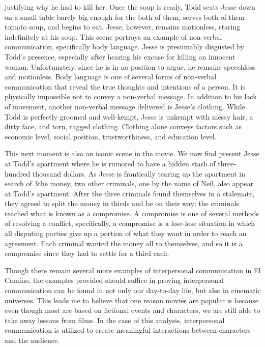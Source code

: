 \documentclass[12pt]{article}
\begin{document}
justifying why he had to kill her. Once the soup is ready, Todd seats Jesse down on
a small table barely big enough for the both of them, serves both of them tomato
soup, and begins to eat. Jesse, however, remains motionless, staring indefinitely
at his soup. This scene portrays an example of non-verbal communication,
specifically body language. Jesse is presumably disgusted by Todd’s presence,
especially after hearing his excuse for killing an innocent woman. Unfortunately,
since he is in no position to argue, he remains speechless and motionless. Body
language is one of several forms of non-verbal communication that reveal the true
thoughts and intentions of a person. It is physically impossible not to convey a
non-verbal message. In addition to his lack of movement, another non-verbal
message delivered is Jesse’s clothing. While Todd is perfectly groomed and
well-kempt, Jesse is unkempt with messy hair, a dirty face, and torn, ragged
clothing. Clothing alone conveys factors such as economic level, social position,
trustworthiness, and education level.
\par
This next moment is also an iconic scene in the movie. We now find present Jesse
at Todd’s apartment where he is rumored to have a hidden stash of three-hundred
thousand dollars. As Jesse is frantically tearing up the apartment in search of
3the money, two other criminals, one by the name of Neil, also appear at Todd’s
apartment. After the three criminals found themselves in a stalemate, they
agreed to split the money in thirds and be on their way; the criminals reached
what is known as a compromise. A compromise is one of several methods of
resolving a conflict, specifically, a compromise is a lose-lose situation in which
all disputing parties give up a portion of what they want in order to reach an
agreement. Each criminal wanted the money all to themselves, and so it is a
compromise since they had to settle for a third each.
\par
Though there remain several more examples of interpersonal communication
in El Camino, the examples provided should suffice in proving interpersonal
communication can be found in not only our day-to-day life, but also in cinematic
universes. This leads me to believe that one reason movies are popular is because
even though most are based on fictional events and characters, we are still
able to take away lessons from films. In the case of this analysis, interpersonal
communication is utilized to create meaningful interactions between characters
and the audience.
\end{document}

